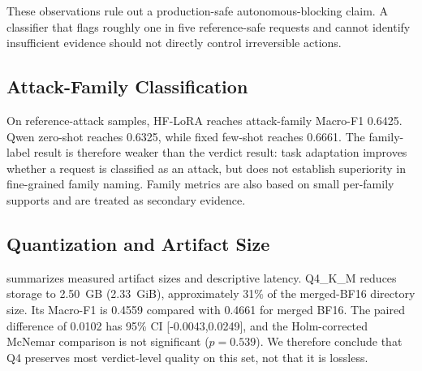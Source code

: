 
These observations rule out a production-safe autonomous-blocking claim. A classifier that flags roughly one in five reference-safe requests and cannot identify insufficient evidence should not directly control irreversible actions.

\subsection{Attack-Family Classification}
On reference-attack samples, HF-LoRA reaches attack-family Macro-F1 0.6425. Qwen zero-shot reaches 0.6325, while fixed few-shot reaches 0.6661. The family-label result is therefore weaker than the verdict result: task adaptation improves whether a request is classified as an attack, but does not establish superiority in fine-grained family naming. Family metrics are also based on small per-family supports and are treated as secondary evidence.

\subsection{Quantization and Artifact Size}
 summarizes measured artifact sizes and descriptive latency. Q4\_K\_M reduces storage to 2.50~GB (2.33~GiB), approximately 31\% of the merged-BF16 directory size. Its Macro-F1 is 0.4559 compared with 0.4661 for merged BF16. The paired difference of 0.0102 has 95\% CI [-0.0043,0.0249], and the Holm-corrected McNemar comparison is not significant ($p=0.539$). We therefore conclude that Q4 preserves most verdict-level quality on this set, not that it is lossless.

\begin{table}[t]
\centering
\caption{Measured artifact size and descriptive latency. Runtime stacks and timing boundaries differ; latency values are not a controlled speed ranking.}
\label{tab:size}
\end{table}

